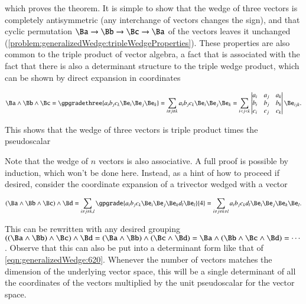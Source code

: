 which proves the theorem.
It is simple to show that the wedge of three vectors is completely antisymmetric (any interchange of vectors changes the sign), and that cyclic permutation \( \Ba \rightarrow \Bb \rightarrow \Bc \rightarrow \Ba \) of the vectors leaves it unchanged
(\cref{problem:generalizedWedge:tripleWedgeProperties}).
These properties are also common to the triple product of  vector algebra, a fact that is associated with the fact that there is also a determinant structure to the triple wedge product, which can be shown by direct expansion in coordinates

\begin{dmath}\label{eqn:generalizedWedge:620}
\Ba \wedge \Bb \wedge \Bc
=
\gpgradethree{ a_i b_j c_k \Be_i \Be_j \Be_k }
=
\sum_{i \ne j \ne k}
a_i b_j c_k \Be_i \Be_j \Be_k
=
\sum_{i < j < k}
\begin{vmatrix}
a_i & a_j & a_k \\
b_i & b_j & b_k \\
c_i & c_j & c_k \\
\end{vmatrix}
\Be_{i j k}.
\end{dmath}

This shows that the  wedge of three vectors is triple product times the pseudoscalar


Note that the wedge of \( n \) vectors is also associative.
A full proof is possible by induction, which won't be done here.
Instead, as a hint of how to proceed if desired,
consider the coordinate expansion of a trivector wedged with a vector

\begin{dmath}\label{eqn:generalizedWedge:660}
(\Ba \wedge \Bb \wedge \Bc) \wedge \Bd
=
\sum_{i \ne j \ne k, l}
\gpgrade{
a_i b_j c_k
\Be_i \Be_j \Be_k
d_l \Be_l
}{4}
=
\sum_{i \ne j \ne k \ne l}
a_i b_j c_k d_l
\Be_i \Be_j \Be_k \Be_l.
\end{dmath}

This can be rewritten with any desired grouping \( ((\Ba \wedge \Bb) \wedge \Bc) \wedge \Bd = (\Ba \wedge \Bb) \wedge ( \Bc \wedge \Bd) = \Ba \wedge (\Bb \wedge \Bc \wedge \Bd) = \cdots \).
Observe that this can also be put into a determinant form like that of
\cref{eqn:generalizedWedge:620}.
Whenever the number of vectors matches the dimension of the underlying vector space, this will be a single determinant of all the coordinates of the vectors multiplied by the unit pseudoscalar for the vector space.

